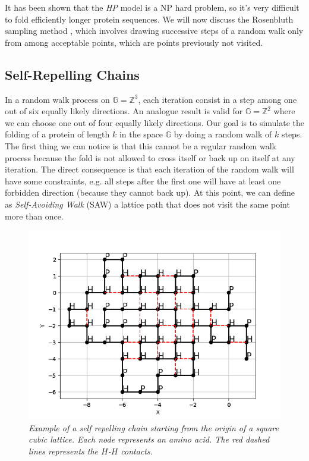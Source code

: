 It has been shown that the \emph{HP} model is a NP hard problem, so it's very difficult to fold efficiently longer protein sequences.
We will now discuss the Rosenbluth sampling method \cite{PERM}, which involves drawing successive steps of a random walk only from among acceptable points, which are points previously not visited.

\subsection{Self-Repelling Chains}
In a random walk process on $\mathbb{G} = \mathbb{Z}^3$, each iteration consist in a step among one out of six equally likely directions.
An analogue result is valid for $\mathbb{G} = \mathbb{Z}^2$ where we can choose one out of four equally likely directions.
Our goal is to simulate the folding of a protein of length $k$ in the space $\mathbb{G}$ by doing a random walk of $k$ steps.
The first thing we can notice is that this cannot be a regular random walk process because the fold is not allowed to cross itself or back up on itself at any iteration.
The direct consequence is that each iteration of the random walk will have some constraints, e.g. all steps after the first one will have at least one forbidden direction (because they cannot back up).
At this point, we can define as \emph{Self-Avoiding Walk} (SAW) a lattice path that does not visit the same point more than once.
\begin{figure}[H]
    \centering
    \includegraphics[width=.75\textwidth]{./img/src_example.png}
    \caption{\emph{Example of a self repelling chain starting from the origin of a square cubic lattice.
                    Each node represents an amino acid.
                    The red dashed lines represents the $H$-$H$ contacts.}}
    \label{fig:src_example}
\end{figure}
